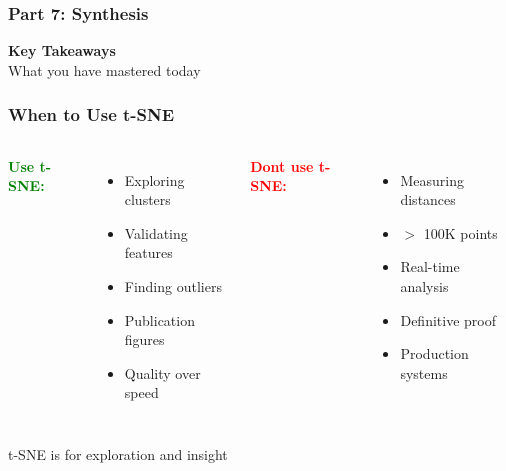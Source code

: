 \documentclass[aspectratio=169]{beamer}
\begin{document}
\begin{frame}
\frametitle{Part 7: Synthesis}

\begin{center}
\LARGE{\textbf{Key Takeaways}}\\[1cm]

What you have mastered today
\end{center}

\end{frame}

\begin{frame}
\frametitle{When to Use t-SNE}

\begin{columns}
\textbf{\textcolor{green}{Use t-SNE:}}
\begin{itemize}
\item Exploring clusters
\item Validating features
\item Finding outliers
\item Publication figures
\item Quality over speed
\end{itemize}

\textbf{\textcolor{red}{Dont use t-SNE:}}
\begin{itemize}
\item Measuring distances
\item $>$ 100K points
\item Real-time analysis
\item Definitive proof
\item Production systems
\end{itemize}
\end{columns}

\vspace{0.5cm}
\centering
\colorbox{blue!20}{t-SNE is for exploration and insight}

\end{frame}
\end{document}
